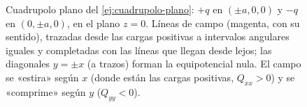 \begin{figure}[ht]
\centering
{}
\caption{Cuadrupolo plano del \cref{ej:cuadrupolo-plano}: $+q$ en $(\pm a,0,0)$ y $-q$ en $(0,\pm a,0)$, en el plano $z=0$. Líneas de campo (magenta, con su sentido), trazadas desde las cargas positivas a
intervalos angulares iguales y completadas con las líneas que llegan desde lejos; las diagonales $y=\pm x$ (a trazos) forman la equipotencial nula. El campo se «estira» según $x$ (donde están las cargas positivas, $Q_{xx}>0$) y se «comprime» según
$y$ ($Q_{yy}<0$).}
\label{fig:cuadrupolo-plano}
\end{figure}
